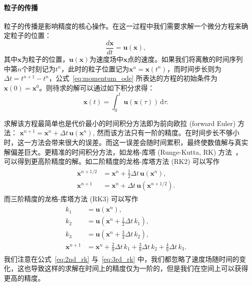 \paragraph{粒子的传播}
粒子的传播是影响精度的核心操作。在这一过程中我们需要求解一个微分方程来确定粒子的位置：
\begin{equation}
    \frac{d \mathbf{x}}{d t}=\mathbf{u}(\mathbf{x}),
    \label{eq:momentum_ode}
\end{equation}
其中$\mathbf{x}$为粒子的位置，$\mathbf{u}(\mathbf{x})$为速度场中$\mathbf{x}$点的速度。如果我们将离散的时间序列中第$n$个时刻记为$t^n$，此时的粒子位置记为$\mathbf{x}^{n}=\mathbf{x}(t^{n})$，而时间步长则为$\Delta t=t^{n+1}-t^{n}$，公式~\ref{eq:momentum_ode} 所表达的方程的初始条件为$\mathbf{x}(0)=\mathbf{x}^{0}$。则待求的解可以通过如下积分求得：
\begin{equation}
    \mathbf{x}(t)=\int_{0}^{t} \, \mathbf{u}(\mathbf{x}(\tau)) \, \mathrm{d}\tau.
\end{equation}

求解该方程最简单也是代价最小的时间积分方法即为前向欧拉 (forward Euler) 方法：
$\mathbf{x}^{n+1}=\mathbf{x}^{n}+\Delta t \, \mathbf{u}(\mathbf{x}^{n})$,
然而该方法只有一阶的精度。在时间步长不够小时，这一方法会带来很大的误差。而这一误差会随时间累积，最终使数值解与真实解偏差巨大。更精准的时间积分方法，如龙格-库塔 (Runge-Kutta, RK) 方法~\cite{doi:10.1142/S0218127492000641}，可以得到更高阶精度的解。如二阶精度的龙格-库塔方法 (RK2) 可以写作
\begin{align}
    \begin{split}
    \mathbf{x}^{n+1 / 2} & =\mathbf{x}^n+\frac{1}{2} \Delta t \, \mathbf{u}(\mathbf{x}^n), \\
    \mathbf{x}^{n+1} & =\mathbf{x}^n+\Delta t \, \mathbf{u}(\mathbf{x}^{n+1 / 2}) .
\end{split}
\label{eq:2nd_rk}
\end{align}
而三阶精度的龙格-库塔方法 (RK3) 可以写作
\begin{align}
    \begin{split}
k_1 & =\mathbf{u}(\mathbf{x}^n), \\
k_2 & =\mathbf{u}(\mathbf{x}^n+\frac{1}{2} \Delta t \, k_1), \\
k_3 & =\mathbf{u}(\mathbf{x}^n+\frac{3}{4} \Delta t \, k_2), \\
\mathbf{x}^{n+1} & =\mathbf{x}^n+\frac{2}{9} \Delta t \, k_1+\frac{3}{9} \Delta t \, k_2+\frac{4}{9} \Delta t \, k_3 .
    \end{split}
    \label{eq:3rd_rk}
\end{align}
我们注意在公式~\ref{eq:2nd_rk} 与~\ref{eq:3rd_rk} 中，我们都忽略了速度场随时间的变化，这也导致这样的求解在时间上的精度仅为一阶的，但是我们在空间上可以获得更高的精度。

